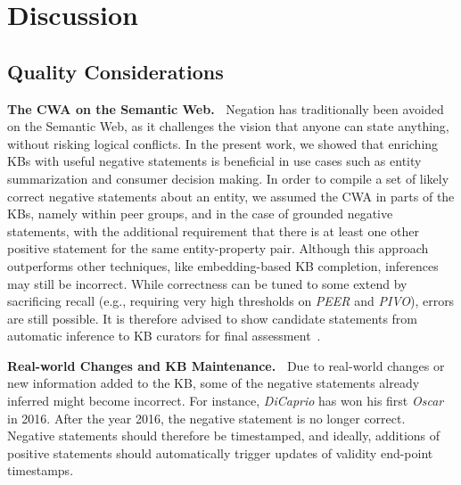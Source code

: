\section{Discussion}
\label{sec:discussion}
\subsection{Quality Considerations}

\noindent
\textbf{The CWA on the Semantic Web.\ }
Negation has traditionally been avoided on the Semantic Web, as it challenges the vision that anyone can state anything, without risking logical conflicts. In the present work, we showed that enriching KBs with useful negative statements is beneficial in use cases such as entity summarization and consumer decision making. In order to compile a set of likely correct negative statements about an entity, we assumed the CWA in parts of the KBs, namely within peer groups, and in the case of 
grounded
%
negative statements, with the additional requirement that there is at least one other positive statement for the same entity-property pair. Although this approach outperforms other techniques, like embedding-based KB completion, inferences may still be incorrect. While correctness can be tuned to some extend by sacrificing recall (e.g., requiring very high thresholds on \textit{PEER} and \textit{PIVO}), errors are still possible. It is therefore advised to show 
candidate statements from automatic inference to KB curators
for final assessment~\cite{RECOIN}.


\noindent
\textbf{Real-world Changes and KB Maintenance.\ } 
Due to real-world changes or new information added to the KB, some of the negative statements already inferred might become incorrect. For instance, \textit{DiCaprio} has won his first \textit{Oscar} in 2016. After the year 2016, the negative statement  is no longer correct. Negative statements should therefore be timestamped, and ideally, additions of positive statements should automatically trigger updates of validity end-point timestamps.

